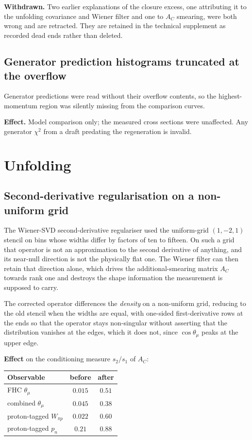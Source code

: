 \textbf{Withdrawn.} Two earlier explanations of the closure excess, one attributing it
to the unfolding covariance and Wiener filter and one to $A_C$ smearing, were both wrong
and are retracted.  They are retained in the technical supplement as recorded dead ends
rather than deleted.

\subsection{Generator prediction histograms truncated at the overflow}

Generator predictions were read without their overflow contents, so the highest-momentum
region was silently missing from the comparison curves.

\textbf{Effect.} Model comparison only; the measured cross sections were unaffected.  Any
generator $\chi^2$ from a draft predating the regeneration is invalid.

\section{Unfolding}

\subsection{Second-derivative regularisation on a non-uniform grid}

The Wiener-SVD second-derivative regulariser used the uniform-grid $(1,-2,1)$ stencil on
bins whose widths differ by factors of ten to fifteen.  On such a grid that operator is
not an approximation to the second derivative of anything, and its near-null direction is
not the physically flat one.  The Wiener filter can then retain that direction alone,
which drives the additional-smearing matrix $A_C$ towards rank one and destroys the shape
information the measurement is supposed to carry.

The corrected operator differences the \emph{density} on a non-uniform grid, reducing to
the old stencil when the widths are equal, with one-sided first-derivative rows at the
ends so that the operator stays non-singular without asserting that the distribution
vanishes at the edges, which it does not, since $\cos\theta_\mu$ peaks at the upper
edge.

\textbf{Effect} on the conditioning measure $s_2/s_1$ of $A_C$:
\begin{center}
\begin{tabular}{lcc}
\toprule
Observable & before & after \\
\midrule
FHC $\theta_\mu$              & $0.015$ & $0.51$ \\
combined $\theta_\mu$         & $0.045$ & $0.38$ \\
proton-tagged $W_{\pi p}$     & $0.022$ & $0.60$ \\
proton-tagged $p_n$           & $0.21$  & $0.88$ \\
\bottomrule
\end{tabular}
\end{center}

